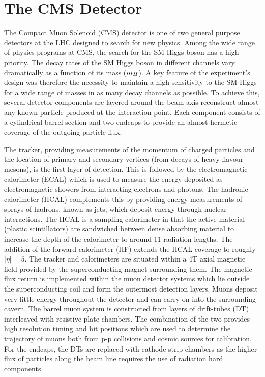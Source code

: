 \section{The CMS Detector}
\label{cmsdetector}
The Compact Muon Solenoid (CMS) detector is one of two general purpose detectors at 
the LHC designed to search for new physics. 
Among the wide range of physics programs at CMS, the search for the SM Higgs boson 
has a high priority. The decay rates of the SM Higgs boson in different 
channels vary dramatically as a function of its mass ($m_{H}$). A key feature of the experiment's design
was therefore the necessity to maintain a high sensitivity to the SM Higgs for a wide range of masses in as many 
decay channels as possible. To achieve this, several detector components are layered around 
the beam axis reconstruct almost any known particle produced at the interaction point.
Each component consists of a cylindrical barrel section and two endcaps 
to provide an almost hermetic coverage of the outgoing particle flux.


The tracker, providing measurements of the momentum of charged particles and the location of 
primary and secondary vertices (from decays of heavy flavour mesons), is the first layer of detection.
This is followed by the electromagnetic calorimeter (ECAL) which is used to measure
the energy deposited as electromagnetic showers from interacting electrons and photons. 
The hadronic calorimeter (HCAL) complements this by providing energy measurements of 
sprays of hadrons, known as jets, which deposit energy through nuclear interactions. 
The HCAL is a sampling calorimeter in that the active material (plastic scintillators)
are sandwiched between dense absorbing material to increase the depth of the calorimeter to
around 11 radiation lengths. The addition of the forward calorimeter (HF) extends the HCAL
coverage to roughly $|\eta|=5$.  
The tracker and calorimeters are situated within a 4T axial magnetic field 
provided by the superconducting magnet surrounding them.
The magnetic flux return is implemented within the  muon detector systems which lie outside 
the superconducting coil and form the outermost detection layers. Muons deposit very little energy 
throughout the detector and can carry on into the surrounding cavern.
The barrel muon system is constructed from layers of drift-tubes (DT) interleaved with 
resistive plate chambers. The combination of the two provides high resolution
timing and hit positions which are used to determine the trajectory of muons both from
p-p collisions and cosmic sources for calibration. For the endcaps, the DTs are replaced
with cathode strip chambers as the higher flux of particles along the beam line
requires the use of radiation hard components.

